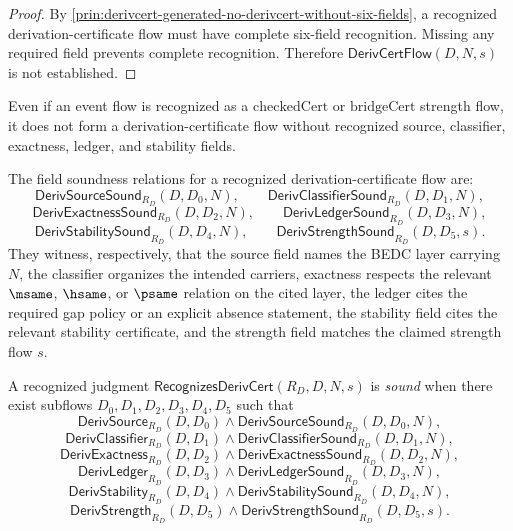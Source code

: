 \begin{proof}
By \autoref{prin:derivcert-generated-no-derivcert-without-six-fields}, a recognized derivation-certificate flow must have complete six-field recognition. Missing any required field prevents complete recognition. Therefore $\mathsf{DerivCertFlow}(D,N,s)$ is not established.
\end{proof}

\begin{corollary}
\label{cor:derivcert-generated-strength-alone-insufficient}
Even if an event flow is recognized as a $\mathrm{checkedCert}$ or $\mathrm{bridgeCert}$ strength flow, it does not form a derivation-certificate flow without recognized source, classifier, exactness, ledger, and stability fields.
\end{corollary}

\begin{definition}
\label{def:derivcert-generated-field-soundness}
The field soundness relations for a recognized derivation-certificate flow are:
$$
  \mathsf{DerivSourceSound}_{R_D}(D,D_0,N),
  \qquad
  \mathsf{DerivClassifierSound}_{R_D}(D,D_1,N),
$$
$$
  \mathsf{DerivExactnessSound}_{R_D}(D,D_2,N),
  \qquad
  \mathsf{DerivLedgerSound}_{R_D}(D,D_3,N),
$$
$$
  \mathsf{DerivStabilitySound}_{R_D}(D,D_4,N),
  \qquad
  \mathsf{DerivStrengthSound}_{R_D}(D,D_5,s).
$$
They witness, respectively, that the source field names the BEDC layer carrying $N$, the classifier organizes the intended carriers, exactness respects the relevant $\msame$, $\hsame$, or $\psame$ relation on the cited layer, the ledger cites the required gap policy or an explicit absence statement, the stability field cites the relevant stability certificate, and the strength field matches the claimed strength flow $s$.
\end{definition}

\begin{definition}
\label{def:derivcert-generated-sound-recognized-flow}
A recognized judgment $\mathsf{RecognizesDerivCert}(R_D,D,N,s)$ is \emph{sound} when there exist subflows $D_0,D_1,D_2,D_3,D_4,D_5$ such that
$$
  \mathsf{DerivSource}_{R_D}(D,D_0)
  \wedge
  \mathsf{DerivSourceSound}_{R_D}(D,D_0,N),
$$
$$
  \mathsf{DerivClassifier}_{R_D}(D,D_1)
  \wedge
  \mathsf{DerivClassifierSound}_{R_D}(D,D_1,N),
$$
$$
  \mathsf{DerivExactness}_{R_D}(D,D_2)
  \wedge
  \mathsf{DerivExactnessSound}_{R_D}(D,D_2,N),
$$
$$
  \mathsf{DerivLedger}_{R_D}(D,D_3)
  \wedge
  \mathsf{DerivLedgerSound}_{R_D}(D,D_3,N),
$$
$$
  \mathsf{DerivStability}_{R_D}(D,D_4)
  \wedge
  \mathsf{DerivStabilitySound}_{R_D}(D,D_4,N),
$$
$$
  \mathsf{DerivStrength}_{R_D}(D,D_5)
  \wedge
  \mathsf{DerivStrengthSound}_{R_D}(D,D_5,s).
$$
\end{definition}

